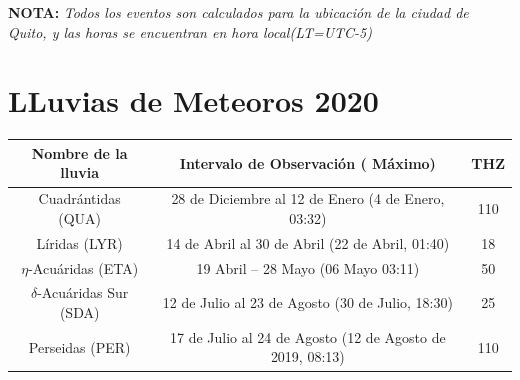 \documentclass[12pt,a4paper,oneside]{article}
\begin{document}
\vspace{1cm}
\textbf{NOTA:  }\textit{Todos los eventos son calculados para la ubicaci\'on de la ciudad de Quito, y las horas se encuentran en hora local(LT=UTC-5)}
\vspace{0.7cm}

\newpage
\section{LLuvias de Meteoros 2020}
\begin{table}[h!b!t!]
\begin{center}
\resizebox{18cm}{!} {
\begin{tabular}{|c|c|c|}
\hline 
\textbf{Nombre de la lluvia}&	\textbf{ Intervalo de Observaci\'on ( M\'aximo)}  &	\textbf{THZ}\\ 
\hline 
\textcolor{blue!80!black}{Cuadr\'antidas (QUA)} &	\textcolor{blue!80!black}{28 de Diciembre al 12 de Enero (4 de Enero, 03:32)} &	\textcolor{blue!80!black}{110}\\ 
\hline 
\textcolor{blue!80!black}{L\'iridas (LYR)} &	\textcolor{blue!80!black}{14 de Abril al 30 de Abril (22 de Abril, 01:40)} & 	\textcolor{blue!80!black}{18}\\ 
\hline 
\textcolor{blue!80!black}{$\eta$-Acu\'aridas (ETA)} & \textcolor{blue!80!black}{19 Abril – 28 Mayo (06 Mayo 03:11)} & 	\textcolor{blue!80!black}{50}\\ 
\hline 
\textcolor{blue!80!black}{$\delta$-Acu\'aridas Sur (SDA)} &	\textcolor{blue!80!black}{12 de Julio  al 23 de Agosto (30 de Julio, 18:30) }&\textcolor{blue!80!black}{25}\\ 
\hline 
\textcolor{blue!80!black}{Perseidas (PER}) 	& \textcolor{blue!80!black}{17 de Julio al 24 de Agosto (12 de Agosto de 2019, 08:13) }&	\textcolor{blue!80!black}{110}\\ 

\end{tabular}}
\end{center}
\end{table}
\end{document}
